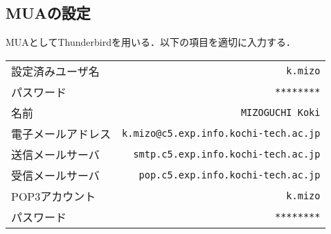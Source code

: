 \subsection{MUAの設定}
MUAとしてThunderbirdを用いる．以下の項目を適切に入力する．
\begin{table}[H]
    \centering
    \begin{tabularx}{\textwidth}{lR}
        \hline
        設定済みユーザ名  & \texttt{k.mizo}                              \\
        パスワード     & \texttt{********}                            \\
        \hline
        名前        & \texttt{MIZOGUCHI Koki}                      \\
        電子メールアドレス & \texttt{k.mizo@c5.exp.info.kochi-tech.ac.jp} \\
        送信メールサーバ  & \texttt{smtp.c5.exp.info.kochi-tech.ac.jp}   \\
        受信メールサーバ  & \texttt{pop.c5.exp.info.kochi-tech.ac.jp}    \\
        POP3アカウント & \texttt{k.mizo}                              \\
        パスワード     & \texttt{********}                            \\
        \hline
    \end{tabularx}
\end{table}
